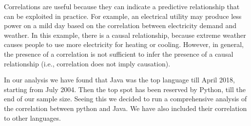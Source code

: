 \documentclass[conference]{IEEEtran}
\begin{document}
Correlations are useful because they can indicate a predictive relationship that can be exploited in practice. For example, an electrical utility may produce less power on a mild day based on the correlation between electricity demand and weather. In this example, there is a causal relationship, because extreme weather causes people to use more electricity for heating or cooling. However, in general, the presence of a correlation is not sufficient to infer the presence of a causal relationship (i.e., correlation does not imply causation). 

In our analysis we have found that Java was the top language till April 2018, starting from July 2004. Then the top spot has been reserved by Python, till the end of our sample size. Seeing this we decided to run a comprehensive analysis of the correlation between python and Java. We have also included their correlation to other languages.
\end{document}

